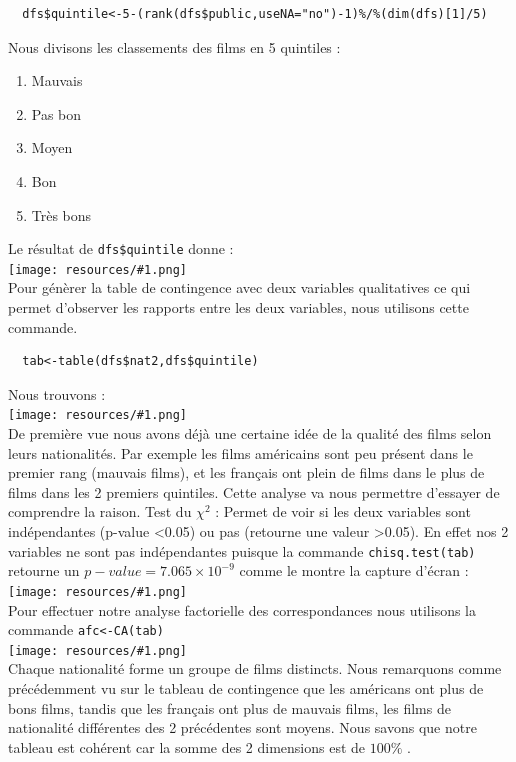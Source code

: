 \documentclass{report}
\newcommand{\photo}[1]{\\
    \texttt{[image: resources/\#1.png]}
\\
}
\begin{document}
\begin{verbatim}
  dfs$quintile<-5-(rank(dfs$public,useNA="no")-1)%/%(dim(dfs)[1]/5)
\end{verbatim}
Nous divisons les classements des films en 5 quintiles :
\begin{enumerate}
  \item Mauvais
  \item Pas bon
  \item Moyen
  \item Bon
  \item Très bons
\end{enumerate}
Le résultat de \texttt{dfs\$quintile} donne :
\photo{30}
Pour génèrer la table de contingence avec deux variables qualitatives ce qui permet d'observer les
rapports entre les deux variables, nous utilisons cette commande.
\begin{verbatim}
  tab<-table(dfs$nat2,dfs$quintile)
\end{verbatim}
Nous trouvons :
\photo{31}
De première vue nous avons déjà une certaine idée de la qualité des films selon leurs nationalités.
Par exemple les films américains sont peu présent dans le premier rang (mauvais films), et les français
ont plein de films dans le plus de films dans les 2 premiers quintiles. Cette analyse va nous permettre
d'essayer de comprendre la raison.
Test du $\chi^2$ : Permet de voir si les deux variables sont indépendantes (p-value <0.05) ou pas
(retourne une valeur >0.05). En effet nos 2 variables ne sont pas indépendantes puisque
la commande \texttt{chisq.test(tab)} retourne un $p-value=7.065\times10^{-9}$
comme le montre la capture d'écran :
\photo{32}
Pour effectuer notre analyse factorielle des correspondances nous utilisons la commande \texttt{afc<-CA(tab)}
\photo{33}
Chaque nationalité forme un groupe de films distincts. Nous remarquons comme précédemment vu sur le
tableau de contingence que les américans ont plus de bons films, tandis que les français ont plus
de mauvais films, les films de nationalité différentes des 2 précédentes sont moyens.
Nous savons que notre tableau est cohérent car la somme des 2 dimensions est de $100\%$ .
\end{document}
